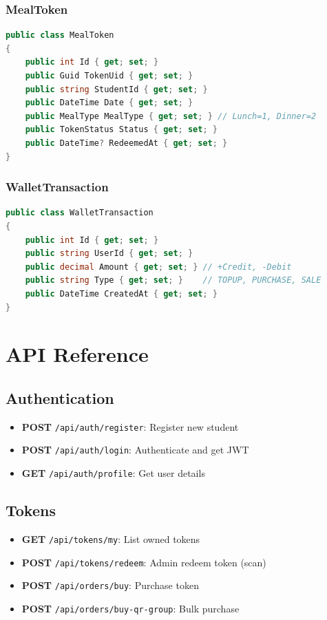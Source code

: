 \documentclass[11pt,a4paper]{report}
\begin{document}
\subsection{MealToken}
\begin{lstlisting}[language=csharp]
public class MealToken
{
    public int Id { get; set; }
    public Guid TokenUid { get; set; } 
    public string StudentId { get; set; }
    public DateTime Date { get; set; }
    public MealType MealType { get; set; } // Lunch=1, Dinner=2
    public TokenStatus Status { get; set; }
    public DateTime? RedeemedAt { get; set; }
}
\end{lstlisting}

\subsection{WalletTransaction}
\begin{lstlisting}[language=csharp]
public class WalletTransaction
{
    public int Id { get; set; }
    public string UserId { get; set; }
    public decimal Amount { get; set; } // +Credit, -Debit
    public string Type { get; set; }    // TOPUP, PURCHASE, SALE
    public DateTime CreatedAt { get; set; }
}
\end{lstlisting}

\chapter{API Reference}

\section{Authentication}
\begin{itemize}
    \item \textbf{POST} \texttt{/api/auth/register}: Register new student
    \item \textbf{POST} \texttt{/api/auth/login}: Authenticate and get JWT
    \item \textbf{GET} \texttt{/api/auth/profile}: Get user details
\end{itemize}

\section{Tokens}
\begin{itemize}
    \item \textbf{GET} \texttt{/api/tokens/my}: List owned tokens
    \item \textbf{POST} \texttt{/api/tokens/redeem}: Admin redeem token (scan)
    \item \textbf{POST} \texttt{/api/orders/buy}: Purchase token
    \item \textbf{POST} \texttt{/api/orders/buy-qr-group}: Bulk purchase
\end{itemize}
\end{document}
